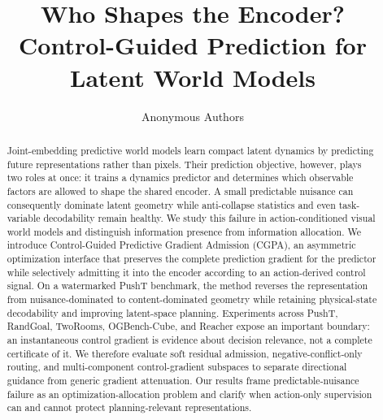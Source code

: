 \documentclass[10pt,twocolumn]{article}
\title{Who Shapes the Encoder?\\
Control-Guided Prediction for Latent World Models}
\author{Anonymous Authors}
\date{}
\newcommand{\method}{Control-Guided Predictive Gradient Admission}
\newcommand{\shortmethod}{CGPA}
\begin{document}
\maketitle

\begin{abstract}
Joint-embedding predictive world models learn compact latent dynamics by
predicting future representations rather than pixels.  Their prediction
objective, however, plays two roles at once: it trains a dynamics predictor
and determines which observable factors are allowed to shape the shared
encoder.  A small predictable nuisance can consequently dominate latent
geometry while anti-collapse statistics and even task-variable decodability
remain healthy.  We study this failure in action-conditioned visual world
models and distinguish information presence from information allocation.
We introduce \method{} (\shortmethod{}), an asymmetric optimization interface
that preserves the complete prediction gradient for the predictor while
selectively admitting it into the encoder according to an action-derived
control signal.  On a watermarked PushT benchmark, the method reverses the
representation from nuisance-dominated to content-dominated geometry while
retaining physical-state decodability and improving latent-space planning.
Experiments across PushT, RandGoal, TwoRooms, OGBench-Cube, and Reacher expose
an important boundary: an instantaneous control gradient is evidence about
decision relevance, not a complete certificate of it.  We therefore evaluate
soft residual admission, negative-conflict-only routing, and multi-component
control-gradient subspaces to separate directional guidance from generic
gradient attenuation.  Our results frame predictable-nuisance failure as an
optimization-allocation problem and clarify when action-only supervision can
and cannot protect planning-relevant representations.
\end{abstract}










\end{document}
